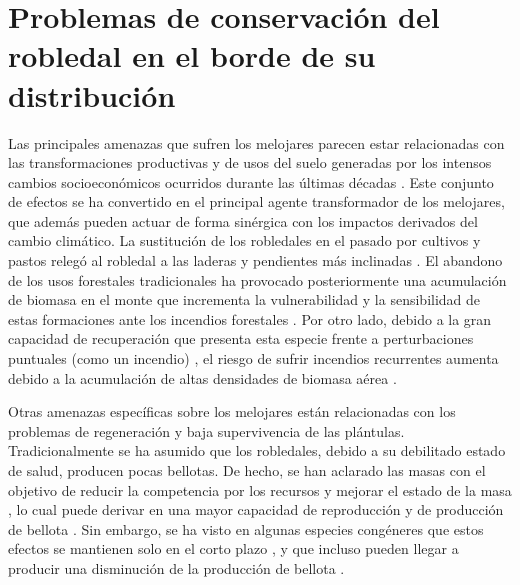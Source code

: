 \section{Problemas de conservación del robledal en el borde de su distribución}\label{sec:intro:problemas}

Las principales amenazas que sufren los melojares parecen estar relacionadas con las transformaciones productivas y de usos del suelo generadas por los intensos cambios socioeconómicos ocurridos durante las últimas décadas \autocites{Vericatetal2012GestionAdaptativa,PiqueVericat2015EvolutionPerspectives}. Este conjunto de efectos se ha convertido en el principal agente transformador de los melojares, que además pueden actuar de forma sinérgica con los impactos derivados del cambio climático. La sustitución de los robledales en el pasado por cultivos y pastos relegó al robledal a las laderas y pendientes más inclinadas \autocites{GarciaJimenez20099230Robledales,BlancoCastroetal2005BosquesIbericos,JimenezOlivenciaetal2015EvolucionUsos,Allue1997GestionRobledales}. El abandono de los usos forestales tradicionales ha provocado posteriormente una acumulación de biomasa en el monte que incrementa la vulnerabilidad y la sensibilidad de estas formaciones ante los incendios forestales \autocites{GarciaJimenez20099230Robledales,Allue1997GestionRobledales,Calvoetal1999PostfireSuccession}. Por otro lado, debido a la gran capacidad de recuperación que presenta esta especie frente a perturbaciones puntuales (como un incendio) \autocites{Calvoetal1999PostfireSuccession,Calvoetal2003RegenerationWildfire}, el riesgo de sufrir incendios recurrentes aumenta debido a la acumulación de altas densidades de biomasa aérea \autocites{Canellasetal2004GrowthResponse,Canellasetal2008SilvicultureCarbon}.

Otras amenazas específicas sobre los melojares están relacionadas con los problemas de regeneración y baja supervivencia de las plántulas. Tradicionalmente se ha asumido que los robledales, debido a su debilitado estado de salud, producen pocas bellotas. De hecho, se han aclarado las masas con el objetivo de reducir la competencia por los recursos y mejorar el estado de la masa \autocites{Canellasetal2004GrowthResponse,Aldeaetal2017ThinningEnhances,MorenoFernandezetal2020InfluenceClimate}, lo cual puede derivar en una mayor capacidad de reproducción y de producción de bellota \autocites{Bravoetal2008SelviculturaMontes}. Sin embargo, se ha visto en algunas especies congéneres que estos efectos se mantienen solo en el corto plazo \autocites{SanchezHumanesEspelta2011IncreasedDrought}, y que incluso pueden llegar a producir una disminución de la producción de bellota \autocites{Martiniketal2017EffectThinning}.

